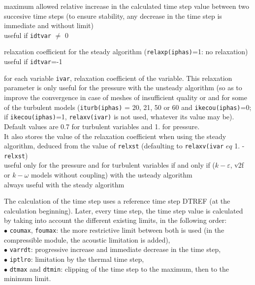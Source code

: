 {maximum allowed relative increase in the calculated time step value
between two succesive time steps (to ensure stability, any decrease in the time step
is immediate and without limit)\\
useful if {\tt idtvar} $\ne$ 0}

{relaxation coefficient for the steady algorithm
 ({\tt relaxp(iphas)}=1: no relaxation)\\
useful if {\tt idtvar}=-1}

{for each variable {\tt ivar}, relaxation coefficient of the variable.
This relaxation parameter is only useful for the pressure with the unsteady
algorithm (so as to improve the convergence in case of meshes of insufficient
quality or and for some of the turbulent models ({\tt iturb(iphas)} = 20, 21,
50 or 60 and {\tt ikecou(iphas)}=0; if {\tt ikecou(iphas)}=1, {\tt relaxv(ivar)}
is not used, whatever its value may be). Default values are 0.7 for turbulent
variables and 1. for pressure.\\
It also stores the value of the relaxation coefficient when using the steady
algorithm, deduced from the value of {\tt relxst} (defaulting to
 {\tt relaxv(ivar} $eq$  {1. - \tt relxst})\\
useful only for the pressure and for turbulent variables
if and only if ($k-\varepsilon$, v2f or $k-\omega$ models without coupling)
 with the usteady algorithm\\
always useful with the steady algorithm}


The calculation of the time step uses a reference time step DTREF (at
the calculation beginning). Later, every time step, the time step value
is calculated by taking into account the different existing limits, in
the following order: \\
\hspace*{1.cm}$\bullet$ {\tt coumax}, {\tt foumax}: the more restrictive limit between
both is used (in the compressible module, the acoustic limitation is added),\\
\hspace*{1.cm}$\bullet$ {\tt varrdt}:  progressive increase and immediate
decrease in the time step,\\
\hspace*{1.cm}$\bullet$ {\tt iptlro}: limitation by the thermal time step,\\
\hspace*{1.cm}$\bullet$ {\tt dtmax} and {\tt dtmin}: clipping of the time step to
the maximum, then to the minimum limit.\\


